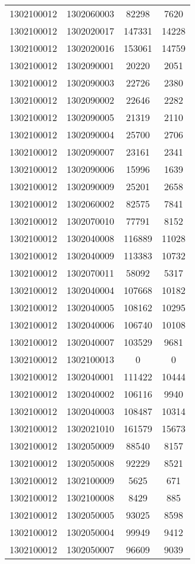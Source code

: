 \begin{longtable}{llcc}
1302100012 & 1302060003 & 82298 & 7620\\
1302100012 & 1302020017 & 147331 & 14228\\
1302100012 & 1302020016 & 153061 & 14759\\
1302100012 & 1302090001 & 20220 & 2051\\
1302100012 & 1302090003 & 22726 & 2380\\
1302100012 & 1302090002 & 22646 & 2282\\
1302100012 & 1302090005 & 21319 & 2110\\
1302100012 & 1302090004 & 25700 & 2706\\
1302100012 & 1302090007 & 23161 & 2341\\
1302100012 & 1302090006 & 15996 & 1639\\
1302100012 & 1302090009 & 25201 & 2658\\
1302100012 & 1302060002 & 82575 & 7841\\
1302100012 & 1302070010 & 77791 & 8152\\
1302100012 & 1302040008 & 116889 & 11028\\
1302100012 & 1302040009 & 113383 & 10732\\
1302100012 & 1302070011 & 58092 & 5317\\
1302100012 & 1302040004 & 107668 & 10182\\
1302100012 & 1302040005 & 108162 & 10295\\
1302100012 & 1302040006 & 106740 & 10108\\
1302100012 & 1302040007 & 103529 & 9681\\
1302100012 & 1302100013 & 0 & 0\\
1302100012 & 1302040001 & 111422 & 10444\\
1302100012 & 1302040002 & 106116 & 9940\\
1302100012 & 1302040003 & 108487 & 10314\\
1302100012 & 1302021010 & 161579 & 15673\\
1302100012 & 1302050009 & 88540 & 8157\\
1302100012 & 1302050008 & 92229 & 8521\\
1302100012 & 1302100009 & 5625 & 671\\
1302100012 & 1302100008 & 8429 & 885\\
1302100012 & 1302050005 & 93025 & 8598\\
1302100012 & 1302050004 & 99949 & 9412\\
1302100012 & 1302050007 & 96609 & 9039\\

\end{longtable}
